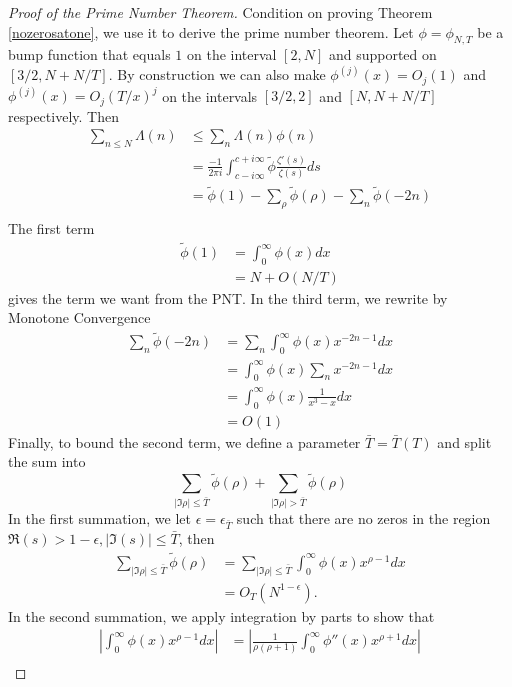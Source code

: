 \begin{proof}[Proof of the Prime Number Theorem]
    Condition on proving Theorem \ref{nozerosatone}, we use it to derive the prime number theorem.
Let $\phi=\phi_{N,T}$ be a bump function that equals $1$ on the interval $[2,N]$ and supported on $[3/2, N+N/T]$.
By construction we can also make $\phi^{(j)}(x)=O_j(1)$ and $\phi^{(j)}(x)=O_j(T/x)^j$ on the intervals $[3/2, 2]$ and $[N,N+N/T]$ respectively.
Then \begin{align*}
    \sum_{n\leq N}\Lambda(n) &\leq \sum_{n} \Lambda(n)\phi(n)\\
    &= \frac{-1}{2\pi i}\int_{c-i\infty}^{c+i\infty}\tilde{\phi}\frac{\zeta'(s)}{\zeta(s)}ds\\
    &= \tilde{\phi}(1) - \sum_{\rho} \tilde{\phi}(\rho) - \sum_{n} \tilde{\phi}(-2n)\\
\end{align*}
The first term \begin{align*}
    \tilde{\phi}(1) &= \int_{0}^{\infty} \phi(x) dx \\
    &= N+ O(N/T) 
\end{align*}
gives the term we want from the PNT. In the third term, we rewrite by Monotone Convergence \begin{align*}
    \sum_{n} \tilde{\phi}(-2n) &= \sum_{n} \int_{0}^{\infty} \phi(x) x^{-2n-1} dx \\
    &=\int_{0}^{\infty} \phi(x) \sum_{n} x^{-2n-1} dx \\
    &= \int_{0}^{\infty} \phi(x) \frac{1}{x^3-x} dx \\
    &= O(1)
\end{align*} 
Finally, to bound the second term, we define a parameter $\bar{T} = \bar{T}(T)$ and split the sum into\[
\sum_{|\Im{\rho}|\leq \bar{T}}\tilde{\phi}(\rho) + \sum_{|\Im{\rho}| > \bar{T}}\tilde{\phi}(\rho)
\]
In the first summation, we let $\epsilon = \epsilon_{\bar{T}}$ 
such that there are no zeros in the region
$\Re({s})>1-\epsilon, |\Im{(s)}|\leq \bar{T}$, then \begin{align*}
    \sum_{|\Im{\rho}|\leq \bar{T}}\tilde{\phi}(\rho) &= \sum_{|\Im{\rho}|\leq \bar{T}} \int_{0}^{\infty}\phi(x)x^{\rho-1}dx\\
    &= O_{T}(N^{1-\epsilon}).
\end{align*}
In the second summation, we apply integration by parts to show that \begin{align*}
    |\int_{0}^{\infty}\phi(x)x^{\rho-1}dx| &= |\frac{1}{\rho(\rho+1)}\int_{0}^{\infty}\phi''(x)x^{\rho+1}dx|\\

\end{align*}
\end{proof}
